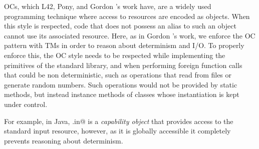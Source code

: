 


OCs, which L42, Pony, and Gordon \etal's work have, are a widely used~\cite{miller2003capability,
noble2016abstract,karger1988improving} programming technique where access to resources are encoded as objects. When this style
is respected, code that does not possess an alias to such an object cannot use its associated resource.
Here, as in Gordon \etal's work, we enforce the OC pattern with TMs in order to reason about determinism and I/O. To properly enforce this, the OC style needs to be respected while implementing the primitives of the standard library, and when performing foreign function calls that could be non deterministic, such as operations that read from files or generate random numbers. Such operations would not be provided by static methods, but instead instance methods of classes whose instantiation is kept under control. 




\lstset{language=Java}
 For example, in Java, \Q@System.in@%
 \lstset{language=FortyTwo}
 is a \emph{capability object} that provides access to the standard input resource, however, as it is globally accessible it completely prevents reasoning about determinism. 

